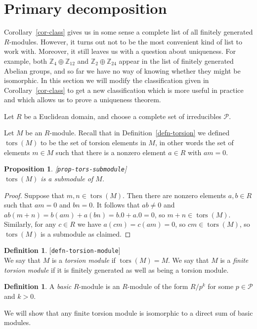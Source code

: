 \documentclass{amsart}
\newcommand{\lbl}[1]{\label{#1}\textup{[\texttt{#1}]}\ \\}
\newcommand{\lbl}{\label}
\newcommand{\tors}      {\operatorname{tors}}
\newcommand{\Z}         {{\mathbb{Z}}}
\newcommand{\tm}        {\times}
\newcommand{\op}        {\oplus}
\newcommand{\CP}        {{\mathcal{P}}}
\renewcommand{\:}{\colon}
\newtheorem{proposition}[theorem]{Proposition}
\theoremstyle{definition}
\newtheorem{definition}[theorem]{Definition}
\begin{document}

\section{Primary decomposition}
\label{sec-primary}

Corollary~\ref{cor-class} gives us in some sense a complete
list of all finitely generated $R$-modules.  However, it turns out not
to be the most convenient kind of list to work with.  Moreover, it
still leaves us with a question about uniqueness.  For example, both
$\Z_4\op\Z_{12}$ and $\Z_2\op\Z_{24}$ appear in the list of finitely
generated Abelian groups, and so far we have no way of knowing whether
they might be isomorphic.  In this section we will modify the
classification given in Corollary~\ref{cor-class} to get a new
classification which is more useful in practice and which allows us to
prove a uniqueness theorem. 

Let $R$ be a Euclidean domain, and choose a complete set of
irreducibles $\CP$.  

Let $M$ be an $R$-module.  Recall that in
Definition~\ref{defn-torsion} we defined $\tors(M)$ to be the set of
torsion elements in $M$, in other words the set of elements $m\in M$
such that there is a nonzero element $a\in R$ with $am=0$.
\begin{proposition}\lbl{prop-tors-submodule}
 $\tors(M)$ is a submodule of $M$.
\end{proposition}
\begin{proof}
 Suppose that $m,n\in\tors(M)$.  Then there are nonzero elements
 $a,b\in R$ such that $am=0$ and $bn=0$.  It follows that $ab\neq 0$
 and $ab(m+n)=b(am)+a(bn)=b.0+a.0=0$, so $m+n\in\tors(M)$.  Similarly,
 for any $c\in R$ we have $a(cm)=c(am)=0$, so $cm\in\tors(M)$, so
 $\tors(M)$ is a submodule as claimed.
\end{proof}

\begin{definition}\lbl{defn-torsion-module}
 We say that $M$ is a \emph{torsion module} if $\tors(M)=M$.  We say
 that $M$ is a \emph{finite torsion module} if it is finitely
 generated as well as being a torsion module.
\end{definition}
\begin{definition}
 A \emph{basic} $R$-module is an $R$-module of the form $R/p^k$ for
 some $p\in\CP$ and $k>0$.
\end{definition}
We will show that any finite torsion module is isomorphic to a direct
sum of basic modules.
\end{document}
